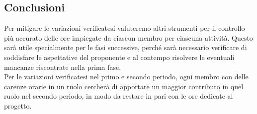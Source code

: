 	\subsection{Conclusioni}
	Per mitigare le variazioni verificatesi valuteremo altri strumenti per il controllo più accurato delle ore impiegate da ciascun membro per ciascuna attività.
	Questo sarà utile specialmente per le fasi successive, perché sarà necessario verificare di soddisfare le aspettative del proponente e al contempo risolvere le eventuali mancanze riscontrate nella prima fase.\\
	Per le variazioni verificatesi nel primo e secondo periodo, ogni membro con delle carenze orarie in un ruolo cercherà di apportare un maggior contributo in quel ruolo nel secondo periodo, in modo da restare in pari con le ore dedicate al progetto.
	